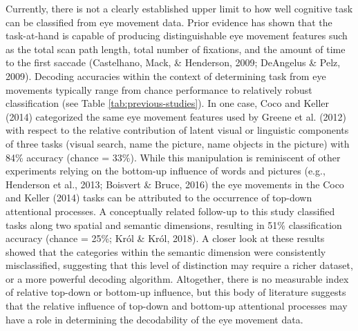 \documentclass[
  english,
  man, donotrepeattitle,floatsintext]{apa6}
\begin{document}
Currently, there is not a clearly established upper limit to how well cognitive task can be classified from eye movement data. Prior evidence has shown that the task-at-hand is capable of producing distinguishable eye movement features such as the total scan path length, total number of fixations, and the amount of time to the first saccade (Castelhano, Mack, \& Henderson, 2009; DeAngelus \& Pelz, 2009). Decoding accuracies within the context of determining task from eye movements typically range from chance performance to relatively robust classification (see Table \ref{tab:previous-studies}). In one case, Coco and Keller (2014) categorized the same eye movement features used by Greene et al. (2012) with respect to the relative contribution of latent visual or linguistic components of three tasks (visual search, name the picture, name objects in the picture) with 84\% accuracy (chance = 33\%). While this manipulation is reminiscent of other experiments relying on the bottom-up influence of words and pictures (e.g., Henderson et al., 2013; Boisvert \& Bruce, 2016) the eye movements in the Coco and Keller (2014) tasks can be attributed to the occurrence of top-down attentional processes. A conceptually related follow-up to this study classified tasks along two spatial and semantic dimensions, resulting in 51\% classification accuracy (chance = 25\%; Król \& Król, 2018). A closer look at these results showed that the categories within the semantic dimension were consistently misclassified, suggesting that this level of distinction may require a richer dataset, or a more powerful decoding algorithm. Altogether, there is no measurable index of relative top-down or bottom-up influence, but this body of literature suggests that the relative influence of top-down and bottom-up attentional processes may have a role in determining the decodability of the eye movement data.
\end{document}
